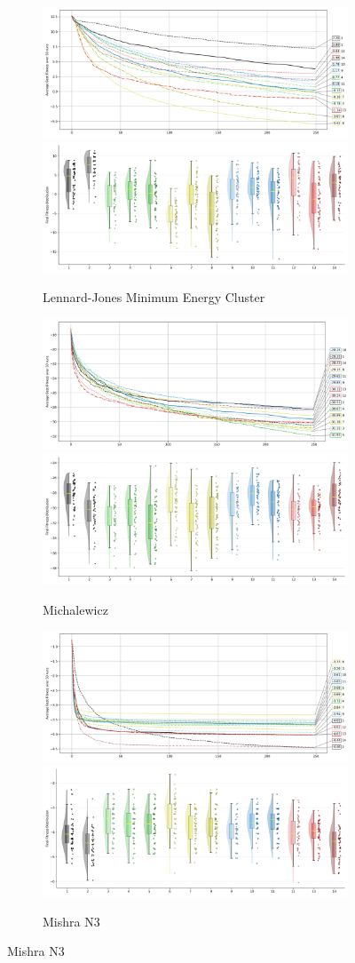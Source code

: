\begin{figure}[p]
\begin{subfigure}{1\textwidth}
    \centering
    \includegraphics[width=.49\textwidth]{Figures/results/100/Lennard_Jones_Minimum_Energy_Cluster_All_selected_algorithms_dim100_annot_legend.png}
    \includegraphics[width=.49\textwidth]{Figures/results/100/Lennard_Jones_Minimum_Energy_Cluster_all_dim100_raincloud_vertical.png}
    \caption{Lennard-Jones Minimum Energy Cluster}
\end{subfigure}

\begin{subfigure}{1\textwidth}
    \centering
    \includegraphics[width=.49\textwidth]{Figures/results/100/Michalewicz_All_selected_algorithms_dim100_annot_legend.png}
    \includegraphics[width=.49\textwidth]{Figures/results/100/Michalewicz_all_dim100_raincloud_vertical.png}
    \caption{Michalewicz}
\end{subfigure}

\begin{subfigure}{1\textwidth}
    \centering
    \includegraphics[width=.49\textwidth]{Figures/results/100/Mishra_N3_All_selected_algorithms_dim100_annot_legend.png}
    \includegraphics[width=.49\textwidth]{Figures/results/100/Mishra_N3_all_dim100_raincloud_vertical.png}
    \caption{Mishra N3}
\end{subfigure}



\end{figure}
